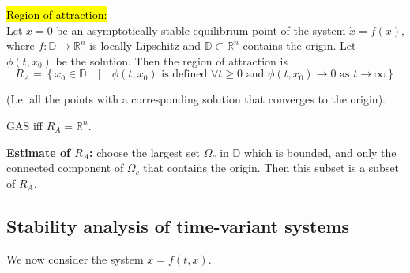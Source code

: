 \begin{definition}
    \hl{Region of attraction:}\\
    Let $x=0$ be an asymptotically stable equilibrium point of the system $\dot{x} = f(x)$, where $f: \mathbb{D} \rightarrow \mathbb{R}^{n}$ is locally Lipschitz and $\mathbb{D} \subset \mathbb{R}^{n}$ contains the origin.
    Let $\phi\left(t, x_{0}\right)$ be the solution. Then the region of attraction is
    \begin{equation}
        R_{A}=\left\{x_{0} \in \mathbb{D} \quad | \quad \phi\left(t, x_{0}\right) \text { is defined } \forall t \geq 0 \text { and } \phi\left(t, x_{0}\right) \rightarrow 0 \text { as } t \rightarrow \infty\right\}
    \end{equation}
\end{definition}
(I.e. all the points with a corresponding solution that converges to the origin).
\begin{remark}
    GAS iff $R_A = \mathbb{R}^n$.
\end{remark}

\textbf{Estimate of $R_A$:} choose the largest set $\Omega_{c}$ in $\mathbb{D}$ which is bounded, and only the connected component of $\Omega_{c}$ that contains the origin.
Then this subset is a subset of $R_A$.

\subsection{Stability analysis of time-variant systems}
We now consider the system $\dot{x} = f(t, x)$.

